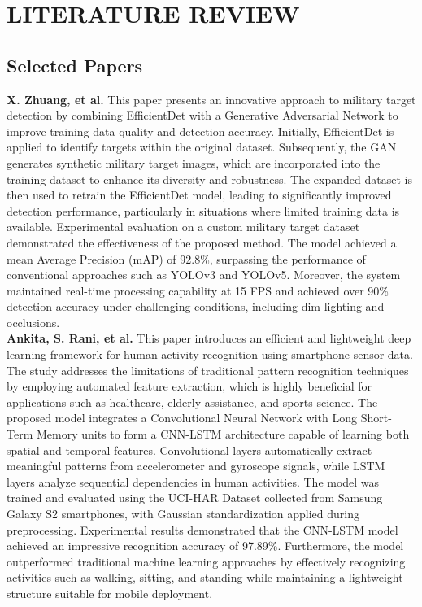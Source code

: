 \chapter{LITERATURE REVIEW}

\section{Selected Papers}
\textbf{X. Zhuang, et al.} This paper presents an innovative approach to military target detection by combining EfficientDet with a Generative Adversarial Network to improve training data quality and detection accuracy. Initially, EfficientDet is applied to identify targets within the original dataset. Subsequently, the GAN generates synthetic military target images, which are incorporated into the training dataset to enhance its diversity and robustness. The expanded dataset is then used to retrain the EfficientDet model, leading to significantly improved detection performance, particularly in situations where limited training data is available. Experimental evaluation on a custom military target dataset demonstrated the effectiveness of the proposed method. The model achieved a mean Average Precision (mAP) of 92.8\%, surpassing the performance of conventional approaches such as YOLOv3 and YOLOv5. Moreover, the system maintained real-time processing capability at 15 FPS and achieved over 90\% detection accuracy under challenging conditions, including dim lighting and occlusions. \cite{base_paper} \\

\textbf{Ankita, S. Rani, et al.} This paper introduces an efficient and lightweight deep learning framework for human activity recognition using smartphone sensor data. The study addresses the limitations of traditional pattern recognition techniques by employing automated feature extraction, which is highly beneficial for applications such as healthcare, elderly assistance, and sports science. The proposed model integrates a Convolutional Neural Network with Long Short-Term Memory units to form a CNN-LSTM architecture capable of learning both spatial and temporal features. Convolutional layers automatically extract meaningful patterns from accelerometer and gyroscope signals, while LSTM layers analyze sequential dependencies in human activities. The model was trained and evaluated using the UCI-HAR Dataset collected from Samsung Galaxy S2 smartphones, with Gaussian standardization applied during preprocessing. Experimental results demonstrated that the CNN-LSTM model achieved an impressive recognition accuracy of 97.89\%. Furthermore, the model outperformed traditional machine learning approaches by effectively recognizing activities such as walking, sitting, and standing while maintaining a lightweight structure suitable for mobile deployment. \cite{supplementary_paper_1} \\


